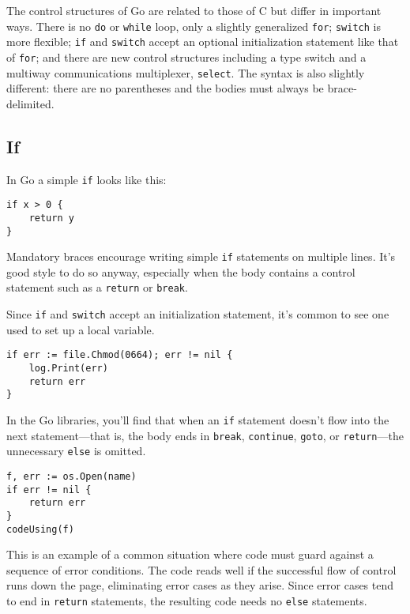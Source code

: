 The control structures of Go are related to those of C but differ in
important ways. There is no \texttt{do} or \texttt{while} loop, only a
slightly generalized \texttt{for}; \texttt{switch} is more flexible;
\texttt{if} and \texttt{switch} accept an optional initialization
statement like that of \texttt{for}; and there are new control
structures including a type switch and a multiway communications
multiplexer, \texttt{select}. The syntax is also slightly different:
there are no parentheses and the bodies must always be brace-delimited.

\subsection*{If}

In Go a simple \texttt{if} looks like this:

\begin{Verbatim}[frame=single]
if x > 0 {
    return y
}
\end{Verbatim}

Mandatory braces encourage writing simple \texttt{if} statements on
multiple lines. It's good style to do so anyway, especially when the
body contains a control statement such as a \texttt{return} or
\texttt{break}.

Since \texttt{if} and \texttt{switch} accept an initialization
statement, it's common to see one used to set up a local variable.

\begin{Verbatim}[frame=single]
if err := file.Chmod(0664); err != nil {
    log.Print(err)
    return err
}
\end{Verbatim}

In the Go libraries, you'll find that when an \texttt{if} statement
doesn't flow into the next statement---that is, the body ends in
\texttt{break}, \texttt{continue}, \texttt{goto}, or
\texttt{return}---the unnecessary \texttt{else} is omitted.

\begin{Verbatim}[frame=single]
f, err := os.Open(name)
if err != nil {
    return err
}
codeUsing(f)
\end{Verbatim}

This is an example of a common situation where code must guard against a
sequence of error conditions. The code reads well if the successful flow
of control runs down the page, eliminating error cases as they arise.
Since error cases tend to end in \texttt{return} statements, the
resulting code needs no \texttt{else} statements.

